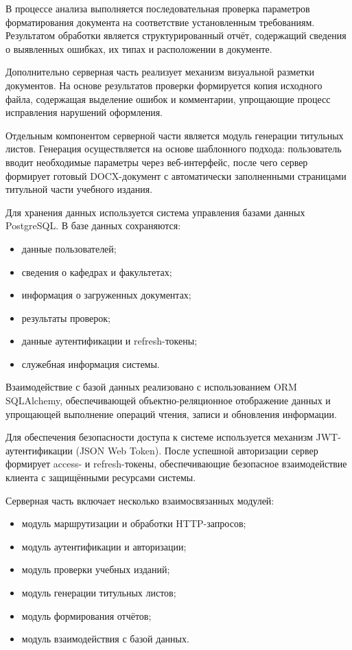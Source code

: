 В процессе анализа выполняется последовательная проверка параметров форматирования документа на соответствие установленным требованиям. Результатом обработки является структурированный отчёт, содержащий сведения о выявленных ошибках, их типах и расположении в документе.

Дополнительно серверная часть реализует механизм визуальной разметки документов. На основе результатов проверки формируется копия исходного файла, содержащая выделение ошибок и комментарии, упрощающие процесс исправления нарушений оформления.

Отдельным компонентом серверной части является модуль генерации титульных листов. Генерация осуществляется на основе шаблонного подхода: пользователь вводит необходимые параметры через веб-интерфейс, после чего сервер формирует готовый DOCX-документ с автоматически заполненными страницами титульной части учебного издания.

Для хранения данных используется система управления базами данных PostgreSQL. В базе данных сохраняются:
\begin{itemize}
	\item данные пользователей;
	\item сведения о кафедрах и факультетах;
	\item информация о загруженных документах;
	\item результаты проверок;
	\item данные аутентификации и refresh-токены;
	\item служебная информация системы.
\end{itemize}

Взаимодействие с базой данных реализовано с использованием ORM SQLAlchemy, обеспечивающей объектно-реляционное отображение данных и упрощающей выполнение операций чтения, записи и обновления информации.

Для обеспечения безопасности доступа к системе используется механизм JWT-аутентификации (JSON Web Token). После успешной авторизации сервер формирует access- и refresh-токены, обеспечивающие безопасное взаимодействие клиента с защищёнными ресурсами системы.

Серверная часть включает несколько взаимосвязанных модулей:
\begin{itemize}
	\item модуль маршрутизации и обработки HTTP-запросов;
	\item модуль аутентификации и авторизации;
	\item модуль проверки учебных изданий;
	\item модуль генерации титульных листов;
	\item модуль формирования отчётов;
	\item модуль взаимодействия с базой данных.
\end{itemize}

